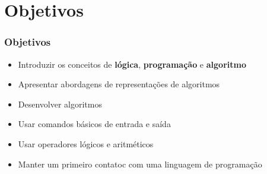 \section{Objetivos}

\begin{frame}
	\frametitle{Objetivos}
	\begin{itemize}
		\item Introduzir os conceitos de \textbf{lógica}, \textbf{programação} e \textbf{algoritmo}
		\item Apresentar abordagens de representações de algoritmos
		\item Desenvolver algoritmos
		\item Usar comandos básicos de entrada e saída
		\item Usar operadores lógicos e aritméticos
		\item Manter um primeiro contatoc com uma linguagem de programação
	\end{itemize}
\end{frame}



